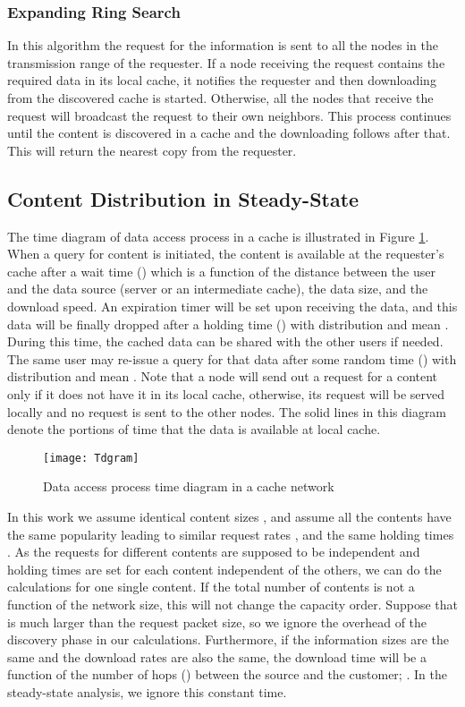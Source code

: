 \documentclass[journal]{IEEEtran}
\theoremstyle{plain}
\theoremstyle{remark}
\begin{document}
\subsubsection{Expanding Ring Search}
In this algorithm the request for the information is sent to all the nodes in the transmission range of the requester. If a node receiving the request contains the required data in its local cache, it notifies the requester and then downloading from the discovered cache is started. Otherwise, all the nodes that receive the request will broadcast the request to their own neighbors. This process continues until the content is discovered in a cache and the downloading follows after that. This will return the nearest copy from the requester.

\subsection{Content Distribution in Steady-State}
\label{SSanalysis}

The time diagram of data access process in a cache is illustrated in Figure \ref{fig:Tdgrm1}.
When a query for content  is initiated, the content is available at the requester's cache after a wait time () which is a function of the distance between the user and the data source (server or an intermediate cache), the data size, and the download speed. An expiration timer will be set upon receiving the data, and this data will be finally dropped after a holding time () with distribution  and mean . During this time, the cached data can be shared with the other users if needed. The same user may re-issue a query for that data after some random time () with distribution  and mean . Note that a node will send out a request for a content only if it does not have it in its local cache, otherwise, its request will be served locally and no request is sent to the other nodes. The solid lines in this diagram denote the portions of time that the data is available at local cache.

\begin{figure}[http]
    \center
      \texttt{[image: Tdgram]}\\
      \caption{Data access process time diagram in a cache network}
    \label{fig:Tdgrm1}
\end{figure}

In this work we assume identical content sizes , and assume all the contents have the same popularity leading to similar request rates , and the same holding times . As the requests for different contents are supposed to be independent and holding times are set for each content independent of the others, we can do the calculations for one single content. If the total number of contents is not a function of the network size, this will not change the capacity order.
Suppose that  is much larger than the request packet size, so we ignore the overhead of the discovery phase in our calculations. Furthermore, if the information sizes are the same and the download rates are also the same, the download time will be a function of the number of hops () between the source and the customer; . In the steady-state analysis, we ignore this constant time.
\end{document}
